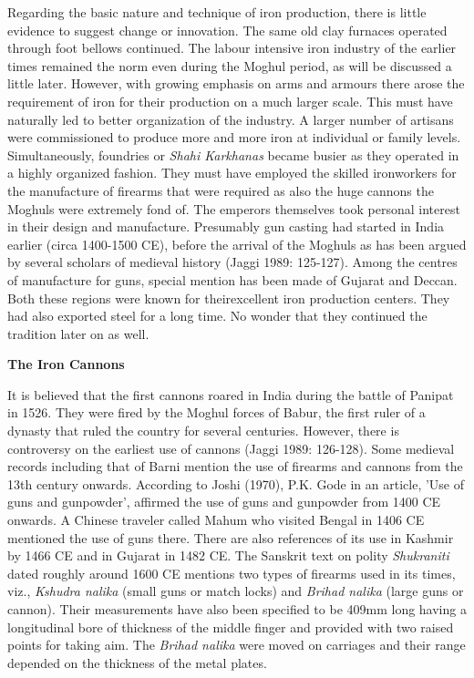 Regarding the basic nature and technique of iron production, there is little evidence to suggest change or innovation. The same old clay furnaces operated through foot bellows continued. The labour intensive iron industry of the earlier times remained the norm even during the Moghul period, as will be discussed a little later. However, with growing emphasis on arms and armours there arose the requirement of iron for their production on a much larger scale. This must have naturally led to better organization of the industry. A larger number of artisans were commissioned to produce more and more iron at individual or family levels. Simultaneously, foundries or \textit{Shahi Karkhanas} became busier as they operated in a highly organized fashion. They must have employed the skilled ironworkers for the manufacture of firearms that were required as also the huge cannons the Moghuls were extremely fond of. The emperors themselves took personal interest in their design and manufacture. Presumably gun casting had started in India earlier (circa 1400-1500 CE), before the arrival of the Moghuls as has been argued by several scholars of medieval history (Jaggi 1989: 125-127). Among the centres of manufacture for guns, special mention has been made of Gujarat and Deccan. Both these regions were known for theirexcellent iron production centers. They had also exported steel for a long time. No wonder that they continued the tradition later on as well.

\textbf{The Iron Cannons}

It is believed that the first cannons roared in India during the battle of Panipat in 1526. They were fired by the Moghul forces of Babur, the first ruler of a dynasty that ruled the country for several centuries. However, there is controversy on the earliest use of cannons (Jaggi 1989: 126-128). Some medieval records including that of Barni mention the use of firearms and cannons from the 13th century onwards. According to Joshi (1970), P.K. Gode in an article, 'Use of guns and gunpowder', affirmed the use of guns and gunpowder from 1400 CE onwards. A Chinese traveler called Mahum who visited Bengal in 1406 CE mentioned the use of guns there. There are also references of its use in Kashmir by 1466 CE and in Gujarat in 1482 CE. The Sanskrit text on polity \textit{Shukraniti} dated roughly around 1600 CE mentions two types of firearms used in its times, viz., \textit{Kshudra nalika} (small guns or match locks) and \textit{Brihad nalika} (large guns or cannon). Their measurements have also been specified to be 409mm long having a longitudinal bore of thickness of the middle finger and provided with two raised points for taking aim. The \textit{Brihad nalika} were moved on carriages and their range depended on the thickness of the metal plates.


